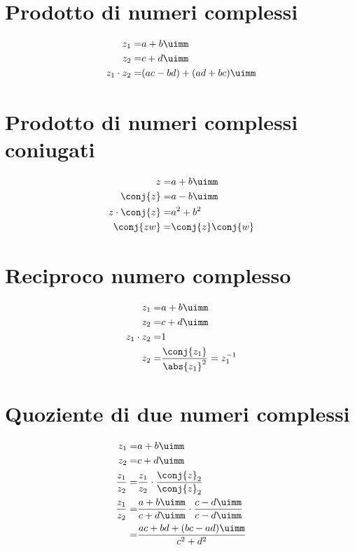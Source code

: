 \section{Prodotto di numeri complessi}
\begin{align*}
z_1=&a+b\uimm\\
z_2=&c+d\uimm\\
z_1\cdot z_2=&(ac-bd)+(ad+bc)\uimm
\end{align*}
\section{Prodotto di numeri complessi coniugati}
\begin{align*}
z=&a+b\uimm\\
\conj{z}=&a-b\uimm\\
z\cdot\conj{z}=&a^2+b^2\\
\conj{zw}=&\conj{z}\conj{w}
\end{align*}
\section{Reciproco numero complesso }
\begin{align*}
z_1=&a+b\uimm\\
z_2=&c+d\uimm\\
z_1\cdot z_2=&1\\
z_2=&\dfrac{\conj{z_1}}{\abs{z_1}^2}=z^{-1}_1\\
\end{align*}
\section{Quoziente di due numeri complessi}
\begin{align*}
z_1=&a+b\uimm\\
z_2=&c+d\uimm\\
\dfrac{z_1}{z_2}=&\dfrac{z_1}{z_2}\cdot\dfrac{\conj{z}_2}{\conj{z}_2}\\
\dfrac{z_1}{z_2}=&\dfrac{a+b\uimm}{c+d\uimm}\cdot\dfrac{c-d\uimm}{c-d\uimm}\\
=&\dfrac{ac+bd+(bc-ad)\uimm}{c^2+d^2}
\end{align*}
